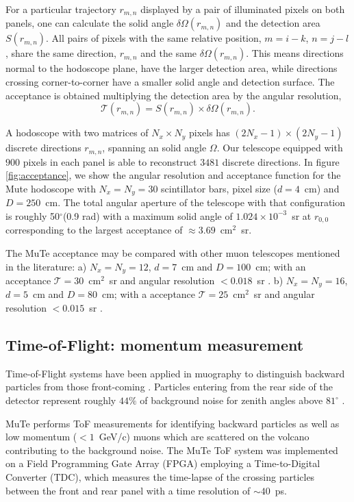 \documentclass[letterpaper,11pt]{article}
\begin{document}
For a particular trajectory $r_{m,n}$ displayed by a pair of illuminated pixels on both panels, one can calculate the solid angle $\delta\Omega(r_{m,n})$ and the detection area $S(r_{m,n})$. All pairs of pixels with the same relative position, {$m=i-k$, $n=j-l$}, share the same direction, $r_{m,n}$ and the same $\delta\Omega(r_{m,n})$. This means directions normal to the hodoscope plane, have the larger detection area, while directions crossing corner-to-corner have a smaller solid angle and detection surface. The acceptance is obtained \cite{LesparreEtal2010} multiplying the detection area by the angular resolution,
\begin{equation}
\mathcal{T}(r_{m,n})=S(r_{m,n})\times \delta\Omega(r_{m,n}).
\end{equation}

A hodoscope with two matrices of $N_x\times N_y$ pixels has $(2N_x-1)\times(2N_y-1)$ discrete directions $r_{m,n}$, spanning an solid angle $\Omega$. Our telescope equipped with $900$ pixels in each panel is able to reconstruct $3481$ discrete directions. In figure \ref{fig:acceptance}, we show the angular resolution and acceptance function for the Mute hodoscope with $N_x=N_y=30$ scintillator bars, pixel size ($d=4$~cm) and $D=250$~cm. The total angular aperture of the telescope with that configuration is roughly 50$^{\circ}$(0.9 rad) with a maximum solid angle of $1.024\times 10^{-3}$~sr at $r_{0,0}$ corresponding to the largest acceptance of $\approx 3.69$~cm$^{2}$~sr.

The MuTe acceptance may be compared with other muon telescopes mentioned in the literature: a) $N_x=N_y=12$, $d=7$~cm and $D=100$~cm; with an acceptance $\mathcal{T}=30$~cm$^{2}$~sr and angular resolution $< 0.018$~sr \cite{UchidaTanakaTanaka2009space}. b) $N_x=N_y=16$, $d=5$~cm and $D=80$~cm; with a acceptance $\mathcal{T}=25$~cm$^{2}$~sr and angular resolution $< 0.015$~sr \cite{LesparreEtal2010}.

\subsection{Time-of-Flight: momentum measurement}
Time-of-Flight systems have been applied in muography to distinguish backward particles from those front-coming \cite{jourde2013experimental}. Particles entering from the rear side of the detector represent roughly $44\%$ of background noise for zenith angles above $81^{\circ}$ \cite{nishiyama2016monte}.

MuTe performs ToF measurements for identifying backward particles as well as low momentum ($< 1$~GeV/c) muons which are scattered on the volcano contributing to the background noise. The MuTe ToF system was implemented on a Field Programming Gate Array (FPGA) employing a Time-to-Digital Converter (TDC), which measures the time-lapse of the crossing particles between the front and rear panel with a time resolution of $\sim 40$~ps.
\end{document}
